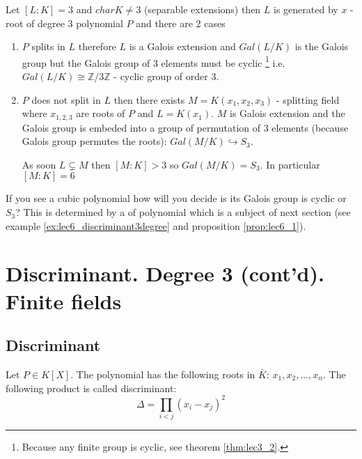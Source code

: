 \begin{example}[Degree 3]
    Let $\left[L:K\right] = 3$ and $char K \ne 3$ (separable
    extensions) then $L$ is generated by $x$ - root of 
    degree 3 polynomial $P$ and there are 2 cases
    \begin{enumerate}
    \item $P$ splits in $L$ therefore $L$ is a Galois extension and
      $Gal\left(L/K\right)$ is the Galois group but the
      Galois group of 3 elements must be cyclic
      \footnote{
        Because any finite group is cyclic, see theorem \ref{thm:lec3_2}.
      }
      i.e.
      $Gal\left(L/K\right) \cong \mathbb{Z}/3\mathbb{Z}$ - cyclic
      group of order 3.
    \item $P$ does not split in $L$ then there exists
      $M = K\left(x_1, x_2, x_3\right)$ - splitting field where
      $x_{1,2,3}$ are roots of $P$ and $L = K\left(x_1\right)$. $M$ is
      Galois extension and the Galois group is embeded into a group of
      permutation of 3 elements (because Galois group permutes the roots):
      $Gal\left(M/K\right) \hookrightarrow S_3$.

      As soon $L \subsetneq M$ then $\left[M:K\right] > 3$ so
      $Gal\left(M/K\right) = S_3$. In particular
      $\left[M:K\right] = 6$
    \end{enumerate}

    If you see a cubic polynomial how will you decide is its Galois
    group is cyclic or $S_3$? This is determined by a
     of polynomial which is a subject of
    next section (see example \ref{ex:lec6_discriminant3degree}
    and proposition \ref{prop:lec6_1}).

    \label{ex:lec6_degree3}
\end{example}

\section{Discriminant. Degree 3 (cont'd). Finite fields}

\subsection{Discriminant}

\begin{definition}[discriminant]
  Let $P \in K\left[X\right]$. The polynomial has the following roots
  in $\bar{K}$: $x_1, x_2, \dots, x_n$. The following product is
  called discriminant:
  \[
  \Delta = \prod_{i < j} \left(x_i - x_j\right)^2
  \]
  \label{def:discriminant}
\end{definition}

